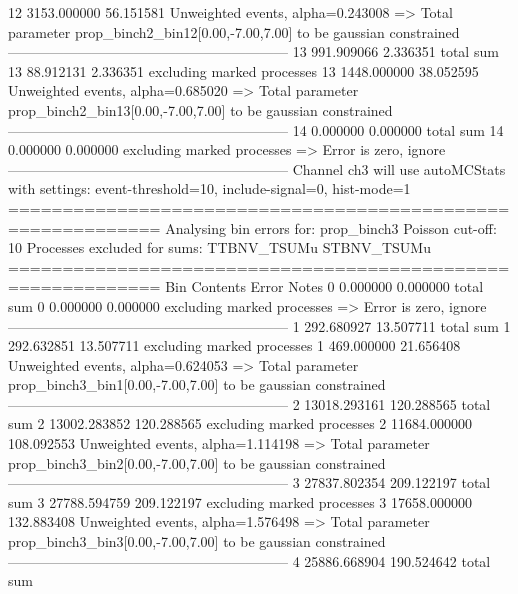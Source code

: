 12         3153.000000     56.151581       Unweighted events, alpha=0.243008
  => Total parameter prop_binch2_bin12[0.00,-7.00,7.00] to be gaussian constrained
------------------------------------------------------------
13         991.909066      2.336351        total sum                     
13         88.912131       2.336351        excluding marked processes    
13         1448.000000     38.052595       Unweighted events, alpha=0.685020
  => Total parameter prop_binch2_bin13[0.00,-7.00,7.00] to be gaussian constrained
------------------------------------------------------------
14         0.000000        0.000000        total sum                     
14         0.000000        0.000000        excluding marked processes    
  => Error is zero, ignore      
------------------------------------------------------------
Channel ch3 will use autoMCStats with settings: event-threshold=10, include-signal=0, hist-mode=1
============================================================
Analysing bin errors for: prop_binch3
Poisson cut-off: 10
Processes excluded for sums: TTBNV_TSUMu STBNV_TSUMu
============================================================
Bin        Contents        Error           Notes                         
0          0.000000        0.000000        total sum                     
0          0.000000        0.000000        excluding marked processes    
  => Error is zero, ignore      
------------------------------------------------------------
1          292.680927      13.507711       total sum                     
1          292.632851      13.507711       excluding marked processes    
1          469.000000      21.656408       Unweighted events, alpha=0.624053
  => Total parameter prop_binch3_bin1[0.00,-7.00,7.00] to be gaussian constrained
------------------------------------------------------------
2          13018.293161    120.288565      total sum                     
2          13002.283852    120.288565      excluding marked processes    
2          11684.000000    108.092553      Unweighted events, alpha=1.114198
  => Total parameter prop_binch3_bin2[0.00,-7.00,7.00] to be gaussian constrained
------------------------------------------------------------
3          27837.802354    209.122197      total sum                     
3          27788.594759    209.122197      excluding marked processes    
3          17658.000000    132.883408      Unweighted events, alpha=1.576498
  => Total parameter prop_binch3_bin3[0.00,-7.00,7.00] to be gaussian constrained
------------------------------------------------------------
4          25886.668904    190.524642      total sum                     
